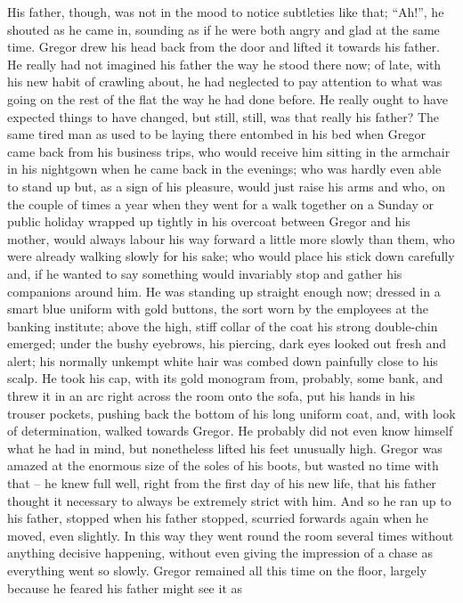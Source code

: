 His father, though, was not in the mood to notice subtleties like that;
“Ah!”, he shouted as he came in, sounding as if he were both angry and
glad at the same time. Gregor drew his head back from the door and
lifted it towards his father. He really had not imagined his father the
way he stood there now; of late, with his new habit of crawling about,
he had neglected to pay attention to what was going on the rest of the
flat the way he had done before. He really ought to have expected
things to have changed, but still, still, was that really his father?
The same tired man as used to be laying there entombed in his bed when
Gregor came back from his business trips, who would receive him sitting
in the armchair in his nightgown when he came back in the evenings; who
was hardly even able to stand up but, as a sign of his pleasure, would
just raise his arms and who, on the couple of times a year when they
went for a walk together on a Sunday or public holiday wrapped up
tightly in his overcoat between Gregor and his mother, would always
labour his way forward a little more slowly than them, who were already
walking slowly for his sake; who would place his stick down carefully
and, if he wanted to say something would invariably stop and gather his
companions around him. He was standing up straight enough now; dressed
in a smart blue uniform with gold buttons, the sort worn by the
employees at the banking institute; above the high, stiff collar of the
coat his strong double-chin emerged; under the bushy eyebrows, his
piercing, dark eyes looked out fresh and alert; his normally unkempt
white hair was combed down painfully close to his scalp. He took his
cap, with its gold monogram from, probably, some bank, and threw it in
an arc right across the room onto the sofa, put his hands in his
trouser pockets, pushing back the bottom of his long uniform coat, and,
with look of determination, walked towards Gregor. He probably did not
even know himself what he had in mind, but nonetheless lifted his feet
unusually high. Gregor was amazed at the enormous size of the soles of
his boots, but wasted no time with that – he knew full well, right from
the first day of his new life, that his father thought it necessary to
always be extremely strict with him. And so he ran up to his father,
stopped when his father stopped, scurried forwards again when he moved,
even slightly. In this way they went round the room several times
without anything decisive happening, without even giving the impression
of a chase as everything went so slowly. Gregor remained all this time
on the floor, largely because he feared his father might see it as
